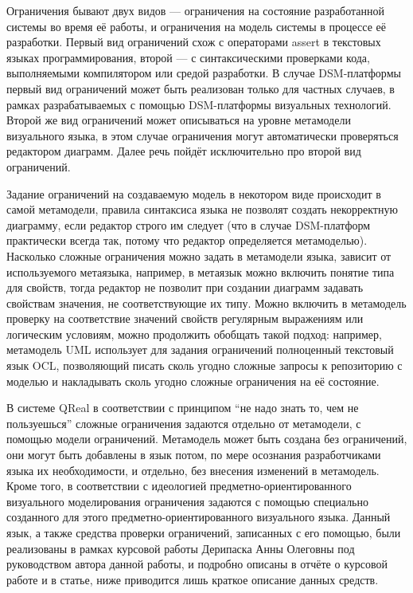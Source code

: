 Ограничения бывают двух видов --- ограничения на состояние разработанной системы во 
время её работы, и ограничения на модель системы в процессе её разработки. Первый 
вид ограничений схож с операторами assert в текстовых языках программирования, второй --- 
с синтаксическими проверками кода, выполняемыми компилятором или средой разработки. 
В случае DSM-платформы первый вид ограничений может быть реализован только для частных 
случаев, в рамках разрабатываемых с помощью DSM-платформы визуальных технологий. Второй 
же вид ограничений может описываться на уровне метамодели визуального языка, в этом 
случае ограничения могут автоматически проверяться редактором диаграмм. Далее речь 
пойдёт исключительно про второй вид ограничений.

Задание ограничений на создаваемую модель в некотором виде происходит в самой метамодели, 
правила синтаксиса языка не позволят создать некорректную диаграмму, если редактор строго 
им следует (что в случае DSM-платформ практически всегда так, потому что редактор 
определяется метамоделью). Насколько сложные ограничения можно задать в метамодели 
языка, зависит от используемого метаязыка, например, в метаязык можно включить понятие 
типа для свойств, тогда редактор не позволит при создании диаграмм задавать свойствам 
значения, не соответствующие их типу. Можно включить в метамодель проверку на соответствие 
значений свойств регулярным выражениям или логическим условиям, можно продолжить обобщать 
такой подход: например, метамодель UML использует для задания ограничений полноценный 
текстовый язык OCL, позволяющий писать сколь угодно сложные запросы к репозиторию с 
моделью и накладывать сколь угодно сложные ограничения на её состояние.

В системе QReal в соответствии с принципом "`не надо знать то, чем не пользуешься"' 
сложные ограничения задаются отдельно от метамодели, с помощью модели ограничений. 
Метамодель может быть создана без ограничений, они могут быть добавлены в язык потом,
по мере осознания разработчиками языка их необходимости, и отдельно, без внесения 
изменений в метамодель. Кроме того, в соответствии с идеологией предметно-ориентированного 
визуального моделирования ограничения задаются с помощью специально созданного для 
этого предметно-ориентированного визуального языка. Данный язык, а также средства 
проверки ограничений, записанных с его помощью, были реализованы в рамках курсовой 
работы Дерипаска Анны Олеговны 
под руководством автора данной работы, и подробно описаны в отчёте о курсовой работе 
и в статье, ниже приводится лишь краткое описание данных средств.

